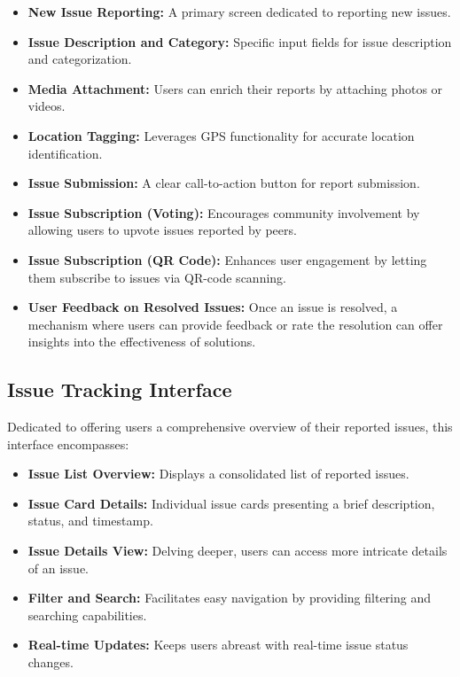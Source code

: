     \begin{itemize}
        \item \textbf{New Issue Reporting:} A primary screen dedicated to reporting new issues.
        \item \textbf{Issue Description and Category:} Specific input fields for issue description and categorization.
        \item \textbf{Media Attachment:} Users can enrich their reports by attaching photos or videos.
        \item \textbf{Location Tagging:} Leverages GPS functionality for accurate location identification.
        \item \textbf{Issue Submission:} A clear call-to-action button for report submission.
        \item \textbf{Issue Subscription (Voting):} Encourages community involvement by allowing users to upvote issues reported by peers.
        \item \textbf{Issue Subscription (QR Code):} Enhances user engagement by letting them subscribe to issues via \gls{QR-code} scanning.
        \item \textbf{User Feedback on Resolved Issues:} Once an issue is resolved, a mechanism where users can provide feedback or rate the resolution can offer insights into the effectiveness of solutions.
    \end{itemize}

\subsection{Issue Tracking Interface}
    Dedicated to offering users a comprehensive overview of their reported issues, this interface encompasses:
    
    \begin{itemize}
        \item \textbf{Issue List Overview:} Displays a consolidated list of reported issues.
        \item \textbf{Issue Card Details:} Individual issue cards presenting a brief description, status, and timestamp.
        \item \textbf{Issue Details View:} Delving deeper, users can access more intricate details of an issue.
        \item \textbf{Filter and Search:} Facilitates easy navigation by providing filtering and searching capabilities.
        \item \textbf{Real-time Updates:} Keeps users abreast with real-time issue status changes.
    \end{itemize}


